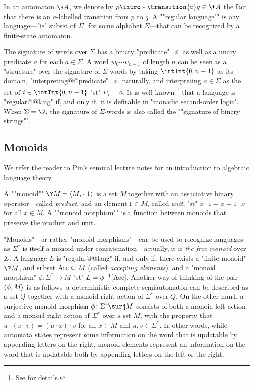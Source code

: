 In an automaton $\+A$, we denote by \AP $p \intro*\transition{a} q \in \+A$
the fact that there is an $a$-labelled transition from $p$ to $q$.
A \AP""regular language"" is any language---"ie" subset of $\Sigma^*$ for some alphabet $\Sigma$---that
can be recognized by a finite-state automaton.

The signature of words over $\Sigma$ has a binary "predicate" $\preceq$
as well as a unary predicate $a$ for each $a\in \Sigma$.
A word $w_0 \cdots w_{n-1}$ of length $n$
can be seen as a "structure" over the signature of $\Sigma$-words
by taking $\intInt{0,n-1}$ as its domain, "interpreting@@predicate"
$\preceq$ naturally, and interpreting $a\in \Sigma$
as the set of $i \in \intInt{0,n-1}$ "st" $w_i = a$.
It is well-known%
\footnote{See  for details.}
that a language is "regular@@lang" if, and only if, it is definable in "monadic second-order logic".
When $\Sigma = \2$, the signature of $\Sigma$-words is also called 
the \AP""signature of binary strings"".

\subsection{Monoids}

We refer the reader to Pin's seminal lecture notes \cite{Pin2022MathematicalFoundations}
for an introduction to algebraic language theory.

A \AP""monoid"" $\?M = \tup{M,{\cdot},1}$ is a set $M$ together with an associative binary operator $\cdot$ called \emph{product}, and an element $1 \in M$, called \emph{unit}, "st" $x\cdot 1 = x = 1 \cdot x$ for all $x\in M$.
A \AP""monoid morphism"" is a function between monoids that preserve the product and unit.

"Monoids"---or rather "monoid morphisms"---can be used to recognize languages as $\Sigma^*$
is itself a monoid under concatenation---actually, it is \emph{the free monoid} over $\Sigma$.
A language $L$ is "regular@@lang" if, and only if, there exists a "finite monoid" $\?M$,
and subset $\textrm{Acc} \subseteq M$ (called \emph{accepting elements}), and a "monoid morphism"
$\phi\colon \Sigma^* \to M$ "st" $L = \phi^{-1}[\textrm{Acc}]$.
Another way of thinking of the pair $\langle\phi, M\rangle$ is as follows:
a deterministic complete semiautomaton can be described as a set $Q$ together
with a monoid right action of $\Sigma^*$ over $Q$. On the other hand,
a surjective monoid morphism $\phi\colon \Sigma^* \surj M$ consists of both a monoid
left action and a monoid right action of $\Sigma^*$ over a set $M$,
with the property that $u \cdot (x \cdot v) = (u \cdot x) \cdot v$ for all 
$x\in M$ and $u,v \in \Sigma^*$.
In other words, while automata states represent some information on the word
that is updatable by appending letters on the right, monoid elements represent
an information on the word that is updatable both by appending letters on the left or the right. 

